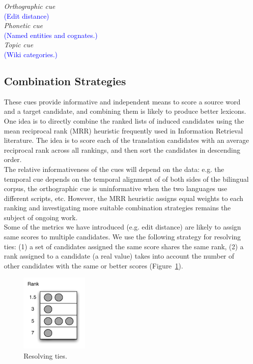 \documentclass{article}
\newcommand{\todo}[1]{\textcolor{blue}{(#1)}}
\newcommand{\figref}[1]{Figure~\ref{#1}}
\begin{document}
\noindent\emph{Orthographic cue} \\

\todo{Edit distance}\\

\noindent\emph{Phonetic cue} \\

\todo{Named entities and cognates.}\\

\noindent\emph{Topic cue} \\

\todo{Wiki categories.}\\

\subsection{Combination Strategies}

These cues provide informative and independent means to score a source word and a target candidate, and combining them is likely to produce better lexicons.  One idea is to directly combine the ranked lists of induced candidates using the mean reciprocal rank (MRR) heuristic frequently used in Information Retrieval literature.  The idea is to score each of the translation candidates with an average reciprocal rank across all rankings, and then sort the candidates in descending order.\\

The relative informativeness of the cues will depend on the data: e.g. the temporal cue depends on the temporal alignment of of both sides of the bilingual corpus, the orthographic cue is uninformative when the two languages use different scripts, etc.  However, the MRR heuristic assigns equal weights to each ranking and investigating more suitable combination strategies remains the subject of ongoing work.\\ 

Some of the metrics we have introduced (e.g. edit distance) are likely to assign same scores to multiple candidates.  We use the following strategy for resolving ties: (1) a set of candidates assigned the same score shares the same rank, (2) a rank assigned to a candidate (a real value) takes into account the number of other candidates with the same or better scores (\figref{fig:rankties}).\\

\begin{figure}
\centerline{\mbox{\includegraphics[width=1.3in]{figures/rankties}}}
\caption{Resolving ties.}
\label{fig:rankties}
\end{figure}
\end{document}
